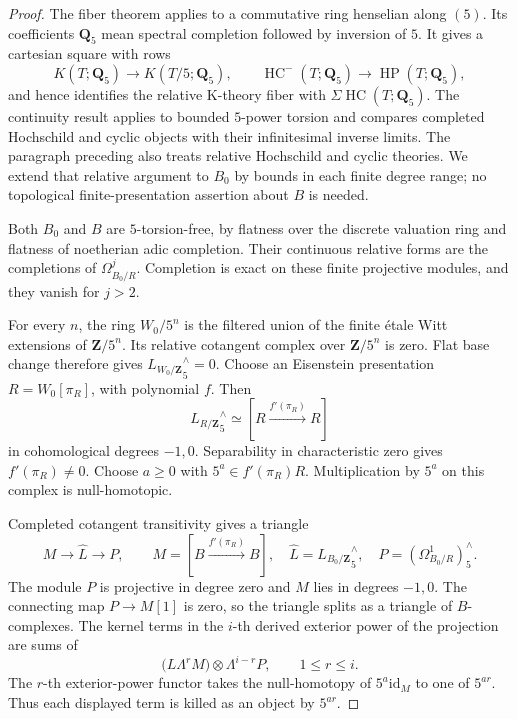 \documentclass[11pt,a4paper]{amsart}
\numberwithin{equation}{section}
\theoremstyle{definition}
\theoremstyle{remark}
\newcommand{\DtwoZZ}{\mathbf{Z}}
\newcommand{\DtwoQQ}{\mathbf{Q}}
\newcommand{\Dtwowh}{\widehat}
\newcommand{\Dtwoid}{\mathrm{id}}
\DeclareMathOperator{\DtwoHC}{HC}
\DeclareMathOperator{\DtwoHP}{HP}
\begin{document}
\begin{proof}
The fiber theorem \cite[Theorem~A]{AMMN} applies to a commutative
ring henselian along \((5)\). Its coefficients \(\DtwoQQ_5\) mean
spectral completion followed by inversion of \(5\).
It gives a cartesian square with rows
\[
 K(T;\DtwoQQ_5)\longrightarrow K(T/5;\DtwoQQ_5),
 \qquad
 \DtwoHC^-(T;\DtwoQQ_5)\longrightarrow\DtwoHP(T;\DtwoQQ_5),
\]
and hence identifies the relative K-theory fiber with
\(\Sigma\DtwoHC(T;\DtwoQQ_5)\).
The continuity result
\cite[Proposition~4.2]{AMMN} applies to bounded \(5\)-power
torsion and compares completed Hochschild and cyclic objects with
their infinitesimal inverse limits.
The paragraph preceding \cite[Proposition~4.10]{AMMN}
also treats relative Hochschild and cyclic theories.
We extend that relative argument to \(B_0\) by bounds in each finite
degree range; no topological finite-presentation assertion about
\(B\) is needed.

Both \(B_0\) and \(B\) are \(5\)-torsion-free, by flatness over the
discrete valuation ring and flatness of noetherian adic completion.
Their continuous relative forms are the completions of
\(\Omega^j_{B_0/R}\). Completion is exact on these finite projective
modules, and they vanish for \(j>2\).

For every \(n\), the ring \(W_0/5^n\) is the filtered union of the
finite \'etale Witt extensions of \(\DtwoZZ/5^n\).
Its relative cotangent complex over \(\DtwoZZ/5^n\) is zero.
Flat base change therefore gives
\({L_{W_0/\DtwoZZ}}^\wedge_5=0\).
Choose an Eisenstein presentation \(R=W_0[\pi_R]\), with polynomial
\(f\). Then
\[
 {L_{R/\DtwoZZ}}^\wedge_5
   \simeq [R\xrightarrow{f'(\pi_R)}R]
\]
in cohomological degrees \(-1,0\).
Separability in characteristic zero gives \(f'(\pi_R)\ne0\).
Choose \(a\ge0\) with \(5^a\in f'(\pi_R)R\).
Multiplication by \(5^a\) on this complex is null-homotopic.

Completed cotangent transitivity gives a triangle
\[
 M\longrightarrow \Dtwowh L\longrightarrow P,
 \qquad
 M=[B\xrightarrow{f'(\pi_R)}B],\quad
 \Dtwowh L={L_{B_0/\DtwoZZ}}^\wedge_5,\quad
 P=(\Omega^1_{B_0/R})^\wedge_5.
\]
The module \(P\) is projective in degree zero and \(M\) lies in
degrees \(-1,0\).
The connecting map \(P\to M[1]\) is zero, so the triangle splits
as a triangle of \(B\)-complexes.
The kernel terms in the \(i\)-th derived exterior power of the
projection are sums of
\[
 \bigl(L\!\Lambda^rM\bigr)\otimes\Lambda^{i-r}P,
 \qquad 1\le r\le i.
\]
The \(r\)-th exterior-power functor takes the null-homotopy of
\(5^a\Dtwoid_M\) to one of \(5^{ar}\).
Thus each displayed term is killed as an object by \(5^{ar}\).


\end{proof}
\end{document}
